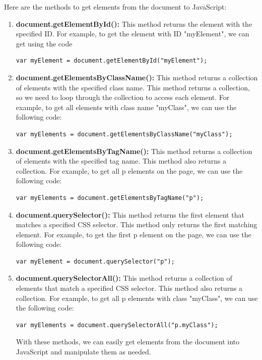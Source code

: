 \documentclass[11pt]{article}
\begin{document}
Here are the methods to get elements from the document to JavaScript:
\begin{enumerate}
    \item  \textbf{document.getElementById():} This method returns the element with the specified ID. For example, to get the element with ID "myElement", we can get using the code
    \begin{lstlisting}[language=html]
        var myElement = document.getElementById("myElement");
    \end{lstlisting}

    \item  \textbf{document.getElementsByClassName():} This method returns a collection of elements with the specified class name. This method returns a collection, so we need to loop through the collection to access each element.
     For example, to get all elements with class name "myClass", we can use the following code:

    \begin{lstlisting}[language=html]
        var myElements = document.getElementsByClassName("myClass");
    \end{lstlisting}

    \item  \textbf{document.getElementsByTagName():} This method returns a collection of elements with the specified tag name. This method also returns a collection.
    For example, to get all p elements on the page, we can use the following code:

    \begin{lstlisting}[language=html]
        var myElements = document.getElementsByTagName("p");
    \end{lstlisting}

    \item  \textbf{document.querySelector():} This method returns the first element that matches a specified CSS selector. This method only returns the first matching element.
    For example, to get the first p element on the page, we can use the following code:

    \begin{lstlisting}[language=html]
        var myElement = document.querySelector("p");
    \end{lstlisting}

    \item  \textbf{document.querySelectorAll():} This method returns a collection of elements that match a specified CSS selector. This method also returns a collection.
    For example, to get all p elements with class "myClass", we can use the following code:

    \begin{lstlisting}[language=html]
        var myElements = document.querySelectorAll("p.myClass");

    \end{lstlisting}

With these methods, we can easily get elements from the document into JavaScript and manipulate them as needed.

\end{enumerate}
\end{document}
